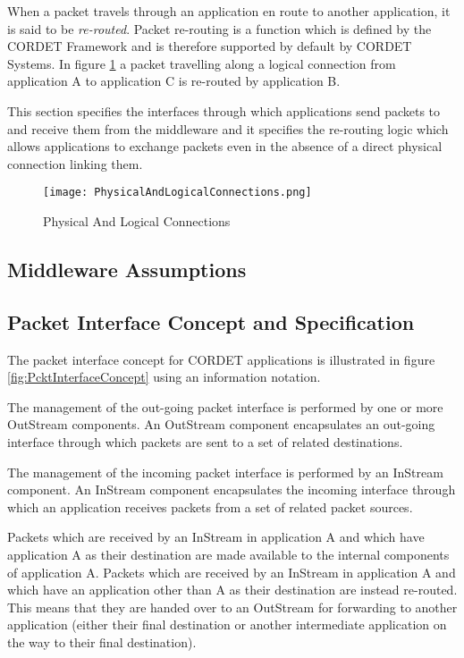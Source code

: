\documentclass{pnp_article}
\begin{document}
When a packet travels through an application en route to another application, it is said to be \textit{re-routed}. Packet re-routing is a function which is defined by the CORDET Framework and is therefore supported by default by CORDET Systems. In figure \ref{fig:PhysicalAndLogicalConnections} a packet travelling along a logical connection from application A to application C is re-routed by application B.

This section specifies the interfaces through which applications send packets to and receive them from the middleware and it specifies the re-routing logic which allows applications to exchange packets even in the absence of a direct physical connection linking them. 

\begin{figure}[ht]
 \centering
 \texttt{[image: PhysicalAndLogicalConnections.png]}
 \caption{Physical And Logical Connections}
 \label{fig:PhysicalAndLogicalConnections}
\end{figure} 

\subsection{Middleware Assumptions}\label{sec:MwAssumptions}
 

\subsection{Packet Interface Concept and Specification}\label{sec:PcktInterfaceConcept}

The packet interface concept for CORDET applications is illustrated in figure \ref{fig:PcktInterfaceConcept} using an information notation.

The management of the out-going packet interface is performed by one or more OutStream components. An OutStream component encapsulates an out-going interface through which packets are sent to a set of related destinations. 

The management of the incoming packet interface is performed by an InStream component. An InStream component encapsulates the incoming interface through which an application receives packets from a set of related packet sources. 

Packets which are received by an InStream in application A and which have application A as their destination are made available to the internal components of application A. Packets which are received by an InStream in application A and which have an application other than A as their destination are instead re-routed. This means that they are handed over to an OutStream for forwarding to another application (either their final destination or another intermediate application on the way to their final destination).
\end{document}
